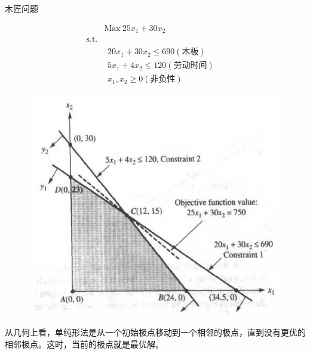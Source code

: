 \documentclass[mathserif, table]{beamer}
\begin{document}
\begin{frame}{木匠问题}
  \begin{figure}
    \begin{minipage}{.5\linewidth}
      \[ 
      \begin{array}{lcl}
        & \mbox{Max}\ 25x_1 + 30x_2 & \\
        \mbox{s.t.} & &  \\
        &
        \begin{array}{c}
          20x_1 + 30x_2 \le 690 (\text{木板})\\
          5x_1 + 4x_2 \le 120 (\text{劳动时间})\\
          x_1, x_2 \ge 0 (\text{非负性})
        \end{array}
        &
      \end{array}
      \]
    \end{minipage}%
    \begin{minipage}{.5\linewidth}
      \includegraphics[width=\textwidth{}]{wood.png}    
    \end{minipage}
  \end{figure}

  \begin{block}{}
    从几何上看，单纯形法是从一个初始极点移动到一个相邻的极点，直到没有更优的相邻极点。这时，当前的极点就是最优解。
  \end{block}
\end{frame}
\end{document}
